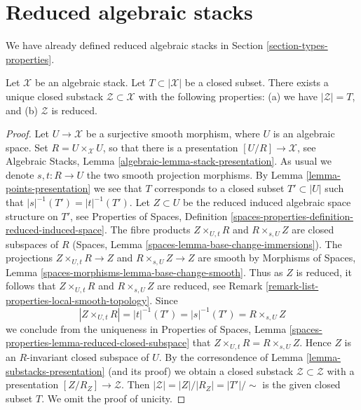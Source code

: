 \section{Reduced algebraic stacks}
\label{section-reduced}

\noindent
We have already defined reduced algebraic stacks in
Section \ref{section-types-properties}.

\begin{lemma}
\label{lemma-reduced-closed-substack}
Let $\mathcal{X}$ be an algebraic stack.
Let $T \subset |\mathcal{X}|$ be a closed subset.
There exists a unique closed substack $\mathcal{Z} \subset \mathcal{X}$
with the following properties:
(a) we have $|\mathcal{Z}| = T$, and (b) $\mathcal{Z}$ is reduced.
\end{lemma}

\begin{proof}
Let $U \to \mathcal{X}$ be a surjective smooth morphism, where $U$ is an
algebraic space. Set $R = U \times_{\mathcal{X}} U$, so that there is a
presentation $[U/R] \to \mathcal{X}$, see
Algebraic Stacks, Lemma \ref{algebraic-lemma-stack-presentation}.
As usual we denote $s, t : R \to U$ the two smooth projection morphisms.
By Lemma \ref{lemma-points-presentation}
we see that $T$ corresponds to a closed subset $T' \subset |U|$ such
that $|s|^{-1}(T') = |t|^{-1}(T')$.
Let $Z \subset U$ be the reduced induced algebraic space
structure on $T'$, see
Properties of Spaces,
Definition \ref{spaces-properties-definition-reduced-induced-space}.
The fibre products
$Z \times_{U, t} R$ and $R \times_{s, U} Z$ are closed subspaces
of $R$
(Spaces, Lemma \ref{spaces-lemma-base-change-immersions}).
The projections $Z \times_{U, t} R \to Z$ and
$R \times_{s, U} Z \to Z$ are smooth by
Morphisms of Spaces, Lemma \ref{spaces-morphisms-lemma-base-change-smooth}.
Thus as $Z$ is reduced, it follows that
$Z \times_{U, t} R$ and $R \times_{s, U} Z$ are reduced, see
Remark \ref{remark-list-properties-local-smooth-topology}.
Since
$$
|Z \times_{U, t} R| = |t|^{-1}(T') = |s|^{-1}(T') = R \times_{s, U} Z
$$
we conclude from the uniqueness in
Properties of Spaces,
Lemma \ref{spaces-properties-lemma-reduced-closed-subspace}
that $Z \times_{U, t} R = R \times_{s, U} Z$.
Hence $Z$ is an $R$-invariant closed subspace of $U$.
By the corresondence of
Lemma \ref{lemma-substacks-presentation}
(and its proof)
we obtain a closed substack $\mathcal{Z} \subset \mathcal{Z}$
with a presentation $[Z/R_Z] \to \mathcal{Z}$.
Then $|\mathcal{Z}| = |Z|/|R_Z| = |T'|/\sim$ is the given
closed subset $T$. We omit the proof of unicity.
\end{proof}

